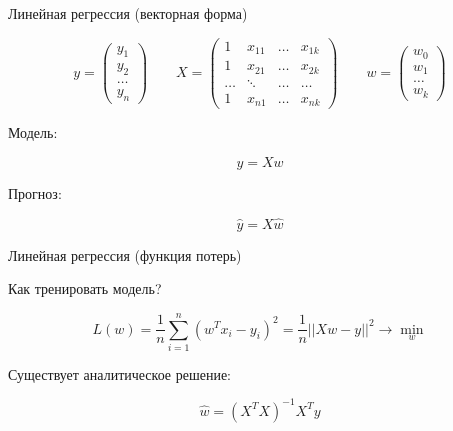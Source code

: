 \documentclass[notes,12pt, aspectratio=169]{beamer}
\begin{document}
\begin{frame}{Линейная регрессия (векторная форма)}

\[
y = \begin{pmatrix} y_1 \\ y_2 \\ \ldots \\ y_n \end{pmatrix}  \qquad X = \begin{pmatrix} 1 & x_{11} & \ldots & x_{1k} \\ 1 & x_{21} & \ldots & x_{2k} \\ \ldots & \ddots & \ldots & \dots \\ 1 & x_{n1} & \ldots & x_{nk} \end{pmatrix}  \qquad  w = \begin{pmatrix} w_0 \\ w_1 \\ \ldots \\ w_k \end{pmatrix} 
\]

Модель: 

\[ 
y = Xw
\]

Прогноз: 

\[
\hat y = X \hat{w}
\]

\end{frame}


\begin{frame}{Линейная регрессия (функция потерь)}

Как тренировать модель? 

\[
L(w) = \frac{1}{n} \sum_{i=1}^n (w^T x_i - y_i)^2 = \frac{1}{n} ||Xw - y||^2 \to \min_{w}
\]

Существует аналитическое решение: 

\[
\hat w = (X^T X)^{-1} X^T y
\]

\end{frame}

{
	\begin{frame}
\end{frame}
}
\end{document}
